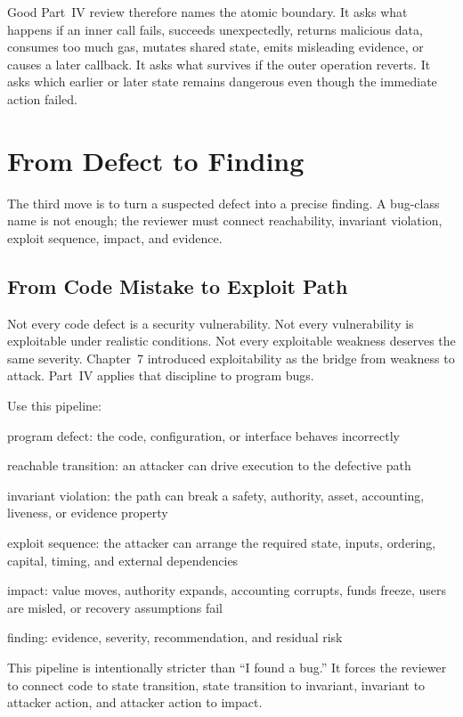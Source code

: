 Good Part~IV review therefore names the atomic boundary. It asks what happens if an inner call fails, succeeds unexpectedly, returns malicious data, consumes too much gas, mutates shared state, emits misleading evidence, or causes a later callback. It asks what survives if the outer operation reverts. It asks which earlier or later state remains dangerous even though the immediate action failed.

\section{From Defect to Finding}

The third move is to turn a suspected defect into a precise finding. A bug-class name is not enough; the reviewer must connect reachability, invariant violation, exploit sequence, impact, and evidence.

\subsection{From Code Mistake to Exploit Path}

Not every code defect is a security vulnerability. Not every vulnerability is exploitable under realistic conditions. Not every exploitable weakness deserves the same severity. Chapter~7 introduced exploitability as the bridge from weakness to attack. Part~IV applies that discipline to program bugs.

Use this pipeline:

\begin{codeblock}
program defect:
    the code, configuration, or interface behaves incorrectly

reachable transition:
    an attacker can drive execution to the defective path

invariant violation:
    the path can break a safety, authority, asset, accounting,
    liveness, or evidence property

exploit sequence:
    the attacker can arrange the required state, inputs, ordering,
    capital, timing, and external dependencies

impact:
    value moves, authority expands, accounting corrupts, funds freeze,
    users are misled, or recovery assumptions fail

finding:
    evidence, severity, recommendation, and residual risk
\end{codeblock}

This pipeline is intentionally stricter than ``I found a bug.'' It forces the reviewer to connect code to state transition, state transition to invariant, invariant to attacker action, and attacker action to impact.


